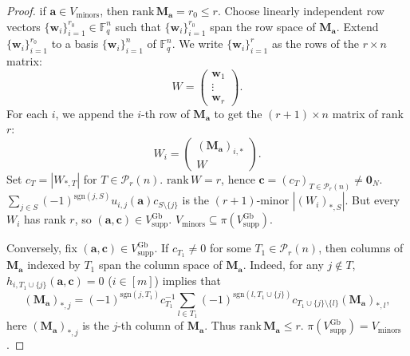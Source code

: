 \documentclass[10pt,a4paper]{amsart}
\newcommand{\fq}{\mathbb{F}_q}
\newcommand{\mc}[1]{\mathcal{#1}}
\newcommand{\ssm}[1]{\sum_{#1}}
\newcommand{\td}[1]{\bm{#1}}
\newcommand{\tx}[1]{\text{#1}}
\begin{document}
	\begin{proof}
		if $\td{a}\in V_{\tx{minors}}$, then $\tx{rank}\,\td{M_a}=r_0\leq r$. Choose linearly independent row vectors $\{\td{w}_i\}_{i=1}^{r_0}\in\fq^n$ such that $\{\td{w}_i\}_{i=1}^{r_0}$ span the row space of $\td{M_a}$. Extend $\{\td{w}_i\}_{i=1}^{r_0}$ to a basis $\{\td{w}_i\}_{i=1}^n$ of $\fq^n$. We write $\{\td{w}_i\}_{i=1}^r$ as the rows of the $r\times n$ matrix:
		\begin{equation*}
			W=\begin{pmatrix}
				\td{w}_1\\
				\vdots\\
				\td{w}_r
			\end{pmatrix}.
		\end{equation*}
		For each $i$, we append the $i$-th row of $\td{M_a}$ to get the $(r+1)\times n$ matrix of rank $r$: 
		\begin{equation*}
			W_i=\begin{pmatrix}
				(\td{M_a})_{i,*}\\
				W
			\end{pmatrix}.
		\end{equation*}
		Set $c_T=|W_{*,T}|$ for $T\in\mc{P}_r(n)$. $\tx{rank}\,W=r$, hence $\td{c}=(c_T)_{T\in\mc{P}_r(n)}\neq\td{0}_N$. $\ssm{j\in S}(-1)^{\tx{sgn}(j,S)}u_{i,j}(\td{a})c_{S\setminus\{j\}}$ is the $(r+1)$-minor $|(W_i)_{*,S}|$. But every $W_i$ has rank $r$, so $(\td{a},\td{c})\in V^{\tx{Gb}}_{\tx{supp}}$. $V_{\tx{minors}}\subseteq\pi(V^{\tx{Gb}}_{\tx{supp}})$.
		
		Conversely, fix $(\td{a},\td{c})\in V^{\tx{Gb}}_{\tx{supp}}$. If $c_{T_1}\neq 0$ for some $T_1\in\mc{P}_r(n)$, then columns of $\td{M_a}$ indexed by $T_1$ span the column space of $\td{M_a}$. Indeed, for any $j\notin T$, $h_{i,T_1\cup\{j\}}(\td{a},\td{c})=0$ ($i\in[m]$) implies that
		\begin{equation*}
			(\td{M_a})_{*,j}=(-1)^{\tx{sgn}(j,T_1)}c_{T_1}^{-1}\ssm{l\in T_1}(-1)^{\tx{sgn}(l,T_1\cup\{j\})}c_{T_1\cup\{j\}\setminus\{l\}}(\td{M_a})_{*,l},
		\end{equation*}
		here $(\td{M_a})_{*,j}$ is the $j$-th column of $\td{M_a}$. Thus $\tx{rank}\,\td{M_a}\leq r$. $\pi(V^{\tx{Gb}}_{\tx{supp}})=V_{\tx{minors}}$. 
	\end{proof}
\end{document}
